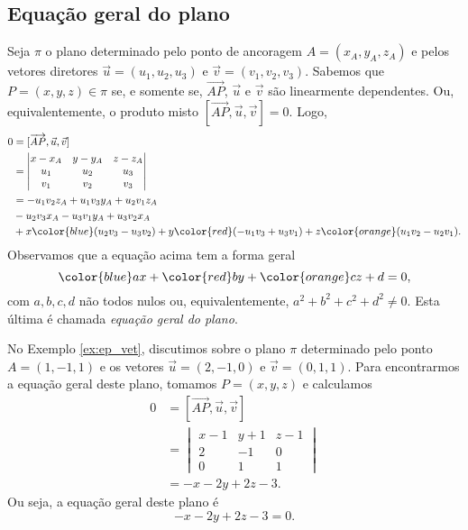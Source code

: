\subsection{Equação geral do plano}

Seja $\pi$ o plano determinado pelo ponto de ancoragem $A=(x_A,y_A,z_A)$ e pelos vetores diretores $\vec{u}=(u_1,u_2,u_3)$ e $\vec{v} = (v_1,v_2,v_3)$. Sabemos que $P=(x,y,z)\in\pi$ se, e somente se, $\overrightarrow{AP}$, $\vec{u}$ e $\vec{v}$ são linearmente dependentes. Ou, equivalentemente, o produto misto $[\overrightarrow{AP},\vec{u},\vec{v}] = 0$. Logo,
\begin{align}
  0 &= [\overrightarrow{AP},\vec{u},\vec{v}] \\
    &=
      \begin{vmatrix}
        x-x_A & y-y_A & z-z_A \\
        u_1 & u_2 & u_3 \\
        v_1 & v_2 & v_3
      \end{vmatrix} \\
    &= -u_1v_2z_A + u_1v_3y_A + u_2v_1z_A \\
    &- u_2v_3x_A - u_3v_1y_A + u_3v_2x_A \\
    &+ x{\color{blue}(u_2v_3 - u_3v_2)} + y{\color{red}(-u_1v_3 + u_3v_1)} + z{\color{orange}(u_1v_2 - u_2v_1)}.
\end{align}
Observamos que a equação acima tem a forma geral
\begin{equation}
  {\color{blue}a}x + {\color{red}b}y + {\color{orange}c}z + d = 0,
\end{equation}
com $a,b,c,d$ não todos nulos ou, equivalentemente, $a^2+b^2+c^2+d^2\neq 0$. Esta última é chamada \emph{equação geral do plano}.

\begin{ex}
  No Exemplo \ref{ex:ep_vet}, discutimos sobre o plano $\pi$ determinado pelo ponto $A = (1,-1,1)$ e os vetores $\vec{u}=(2,-1,0)$ e $\vec{v}=(0,1,1)$. Para encontrarmos a equação geral deste plano, tomamos $P = (x,y,z)$ e calculamos
  \begin{align}
    0 &= [\overrightarrow{AP},\vec{u},\vec{v}]\\
      &=
        \begin{vmatrix}
          x-1 & y+1 & z-1 \\
          2 & -1 & 0 \\
          0 & 1 & 1
        \end{vmatrix}\\
      &= - x - 2 y + 2 z - 3.
  \end{align}
  Ou seja, a equação geral deste plano é
  \begin{equation}
    -x - 2y + 2z -3 = 0.
  \end{equation}
\end{ex}

